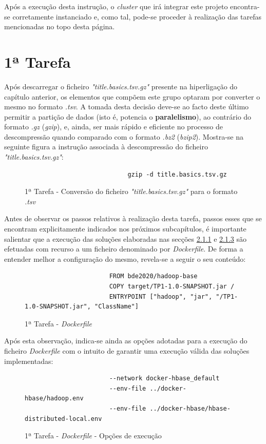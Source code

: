 \documentclass[a4paper]{report}
\begin{document}
{		Após a execução desta instrução, o \textit{cluster} que irá integrar este projeto encontra-se corretamente instanciado e, como tal, pode-se proceder à realização das tarefas mencionadas no topo desta página.
	
	\section{1ª Tarefa} \label{sec:Task1}
		Após descarregar o ficheiro \textit{"title.basics.tsv.gz"} presente na hiperligação do capítulo anterior, os elementos que compõem este grupo optaram por converter o mesmo no formato \textit{.tsv}. 
		A tomada desta decisão deve-se ao facto deste último permitir a partição de dados (isto é, potencia o \textbf{paralelismo}), ao contrário do formato \textit{.gz} (\textit{gzip}), e, ainda, ser mais rápido e eficiente no processo de descompressão quando comparado com o formato \textit{.bz2} (\textit{bzip2}).
		Mostra-se na seguinte figura a instrução associada à descompressão do ficheiro \textit{"title.basics.tsv.gz"}:
		\begin{figure}[H]
			{
				\color{teal}
				\begin{verbatim}
                            gzip -d title.basics.tsv.gz
				\end{verbatim}
			}
			\caption{1ª Tarefa - Conversão do ficheiro \textit{"title.basics.tsv.gz"} para o formato \textit{.tsv}}
            \label{fig:2}
		\end{figure}

		Antes de observar os passos relativos à realização desta tarefa, passos esses que se encontram explicitamente indicados nos próximos subcapítulos, é importante salientar que a execução das soluções elaboradas nas secções \hyperref[subsec:Task1-1]{2.1.1} e \hyperref[subsec:Task1-3]{2.1.3} são efetuadas com recurso a um ficheiro denominado por \textit{Dockerfile}.
		De forma a entender melhor a configuração do mesmo, revela-se a seguir o seu conteúdo:
		\begin{figure}[H]
			{
				\color{teal}
				\begin{verbatim}
					   FROM bde2020/hadoop-base
					   COPY target/TP1-1.0-SNAPSHOT.jar /
					   ENTRYPOINT ["hadoop", "jar", "/TP1-1.0-SNAPSHOT.jar", "ClassName"]
				\end{verbatim}
			}
            \caption{1ª Tarefa - \textit{Dockerfile}}
            \label{fig:3}
        \end{figure}
        
        Após esta observação, indica-se ainda as opções adotadas para a execução do ficheiro \textit{Dockerfile} com o intuito de garantir uma execução válida das soluções implementadas:
		\begin{figure}[H]
			{
				\color{teal}
				\begin{verbatim}
					   --network docker-hbase_default
					   --env-file ../docker-hbase/hadoop.env
					   --env-file ../docker-hbase/hbase-distributed-local.env
				\end{verbatim}
			}
			\caption{1ª Tarefa - \textit{Dockerfile} - Opções de execução}
			\label{fig:4}
        \end{figure}
		
}
\end{document}

